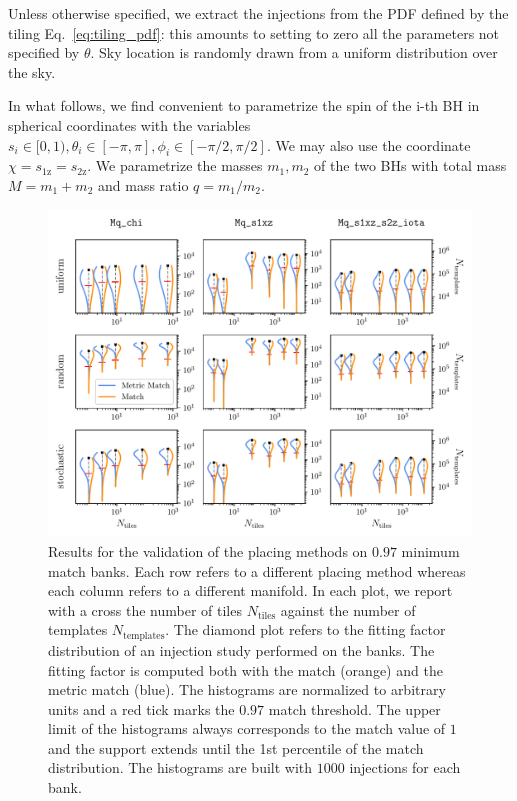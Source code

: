 \documentclass[twocolumn,showpacs,preprintnumbers,nofootinbib,prd,
superscriptaddress,10pt]{revtex4-2}
\begin{document}
Unless otherwise specified, we extract the injections from the PDF defined by the tiling Eq.~\eqref{eq:tiling_pdf}: this amounts to setting to zero all the parameters not specified by $\theta$.
Sky location is randomly drawn from a uniform distribution over the sky.

In what follows, we find convenient to parametrize the spin of the i-th BH in spherical coordinates with the variables $s_i\in[0,1), \theta_i\in[-\pi,\pi], \phi_i\in[-\pi/2,\pi/2]$. We may also use the coordinate $\chi = s_\text{1z} = s_\text{2z}$.
We parametrize the masses $m_1, m_2$ of the two BHs with total mass $M = m_1+m_2$ and mass ratio $q=m_1/m_2$.

\begin{figure}[th!]
	\centering
	\includegraphics[width=.85\textwidth,keepaspectratio]{placing_validation}
	\caption{Results for the validation of the placing methods on $0.97$ minimum match banks. Each row refers to a different placing method whereas each column refers to a different manifold. In each plot, we report with a cross the number of tiles $N_{\text{tiles}}$ against the number of templates $N_{\text{templates}}$.
	The diamond plot refers to the fitting factor distribution of an injection study performed on the banks. The fitting factor is computed both with the match (orange) and the metric match (blue). The histograms are normalized to arbitrary units and a red tick marks the $0.97$ match threshold. The upper limit of the histograms always corresponds to the match value of $1$ and the support extends until the 1st percentile of the match distribution.
	The histograms are built with $1000$ injections for each bank.
	}
	\label{fig:placing_validation}
\end{figure}
\end{document}
